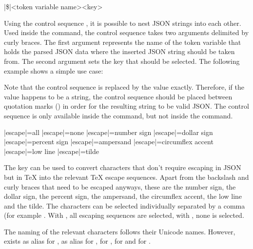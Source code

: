 \documentclass[a4paper]{article}
\begin{document}
{{\begin{macrodef}
|\$|{<token variable name>}{<key>}
\end{macrodef}
Using the control sequence \macro{\$}, it is possible to nest JSON strings into each other. Used inside the \macro{\JSONParse} command, the control sequence takes two arguments delimited by curly braces. The first argument represents the name of the token variable that holds the parsed JSON data where the inserted JSON string should be taken from. The second argument sets the key that should be selected. The following example shows a simple use case:

\begin{codeexamplecolumns}


\end{codeexamplecolumns}

\warning Note that the control sequence \macro{\$} is replaced by the value exactly. Therefore, if the value happens to be a string, the control sequence \macro{\$} should be placed between quotation marks () in order for the resulting string to be valid JSON. The control sequence \macro{\$} is only available inside the \macro{\JSONParse} command, but not inside the \macro{\JSONParseFromFile} command.

\begin{macrodef}
|escape|={all}
|escape|={none}
|escape|={number sign}
|escape|={dollar sign}
|escape|={percent sign}
|escape|={ampersand}
|escape|={circumflex accent}
|escape|={low line}
|escape|={tilde}
\end{macrodef}
The key  can be used to convert characters that don't require escaping in JSON but in TeX into the relevant TeX escape sequences. Apart from the backslash and curly braces that need to be escaped anyways, these are the number sign, the dollar sign, the percent sign, the ampersand, the circumflex accent, the low line and the tilde. The characters can be selected individually separated by a comma (for example . With , all escaping sequences are selected, with , none is selected.

The naming of the relevant characters follows their Unicode names. However,  exists as alias for ,  as alias for ,  for ,  for  and  for .

}}
\end{document}
